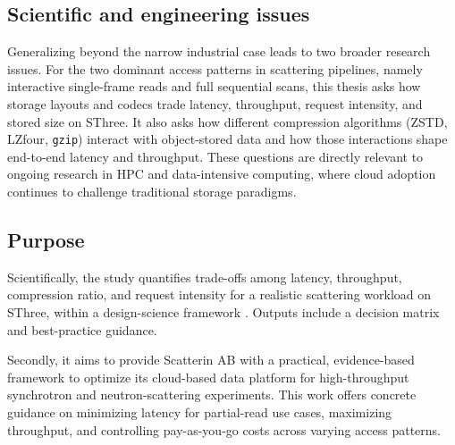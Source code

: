 \documentclass[nomenclature, english, bibtex]{kththesis}
\numberwithin{listing}{chapter}
\begin{document}
\subsection{Scientific and engineering issues}
Generalizing beyond the narrow industrial case leads to two broader research issues. For the two dominant access patterns in scattering pipelines, namely interactive single-frame reads and full sequential scans, this thesis asks how storage layouts and codecs trade latency, throughput, request intensity, and stored size on \gls{SThree}. It also asks how different compression algorithms (\gls{ZSTD}, \gls{LZfour}, \texttt{gzip}) interact with object-stored data and how those interactions shape end-to-end latency and throughput. These questions are directly relevant to ongoing research in \gls{HPC} and data-intensive computing, where cloud adoption continues to challenge traditional storage paradigms.

\subsection{Purpose}
Scientifically, the study quantifies trade-offs among latency, throughput, compression ratio, and request intensity for a realistic scattering workload on \gls{SThree}, within a design-science framework \cite{hevner2004design}. Outputs include a decision matrix and best-practice guidance.

Secondly, it aims to provide Scatterin AB with a practical, evidence-based framework to optimize its cloud-based data platform for high-throughput synchrotron and neutron-scattering experiments. This work offers concrete guidance on minimizing latency for partial-read use cases, maximizing throughput, and controlling pay-as-you-go costs across varying access patterns.
\end{document}
